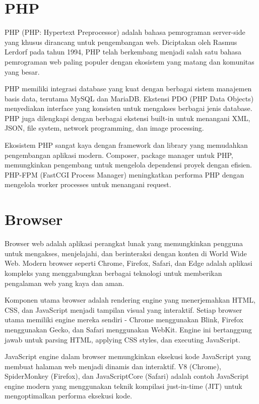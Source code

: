 \documentclass[a4paper,12pt]{report}
\begin{document}
\section{PHP}
PHP (PHP: Hypertext Preprocessor) adalah bahasa pemrograman server-side yang khusus dirancang untuk pengembangan web. Diciptakan oleh Rasmus Lerdorf pada tahun 1994, PHP telah berkembang menjadi salah satu bahasa pemrograman web paling populer dengan ekosistem yang matang dan komunitas yang besar.

PHP memiliki integrasi database yang kuat dengan berbagai sistem manajemen basis data, terutama MySQL dan MariaDB. Ekstensi PDO (PHP Data Objects) menyediakan interface yang konsisten untuk mengakses berbagai jenis database. PHP juga dilengkapi dengan berbagai ekstensi built-in untuk menangani XML, JSON, file system, network programming, dan image processing.

Ekosistem PHP sangat kaya dengan framework dan library yang memudahkan pengembangan aplikasi modern. Composer, package manager untuk PHP, memungkinkan pengembang untuk mengelola dependensi proyek dengan efisien. PHP-FPM (FastCGI Process Manager) meningkatkan performa PHP dengan mengelola worker processes untuk menangani request.

\section{Browser}
Browser web adalah aplikasi perangkat lunak yang memungkinkan pengguna untuk mengakses, menjelajahi, dan berinteraksi dengan konten di World Wide Web. Modern browser seperti Chrome, Firefox, Safari, dan Edge adalah aplikasi kompleks yang menggabungkan berbagai teknologi untuk memberikan pengalaman web yang kaya dan aman.

Komponen utama browser adalah rendering engine yang menerjemahkan HTML, CSS, dan JavaScript menjadi tampilan visual yang interaktif. Setiap browser utama memiliki engine mereka sendiri - Chrome menggunakan Blink, Firefox menggunakan Gecko, dan Safari menggunakan WebKit. Engine ini bertanggung jawab untuk parsing HTML, applying CSS styles, dan executing JavaScript.

JavaScript engine dalam browser memungkinkan eksekusi kode JavaScript yang membuat halaman web menjadi dinamis dan interaktif. V8 (Chrome), SpiderMonkey (Firefox), dan JavaScriptCore (Safari) adalah contoh JavaScript engine modern yang menggunakan teknik kompilasi just-in-time (JIT) untuk mengoptimalkan performa eksekusi kode.
\end{document}
